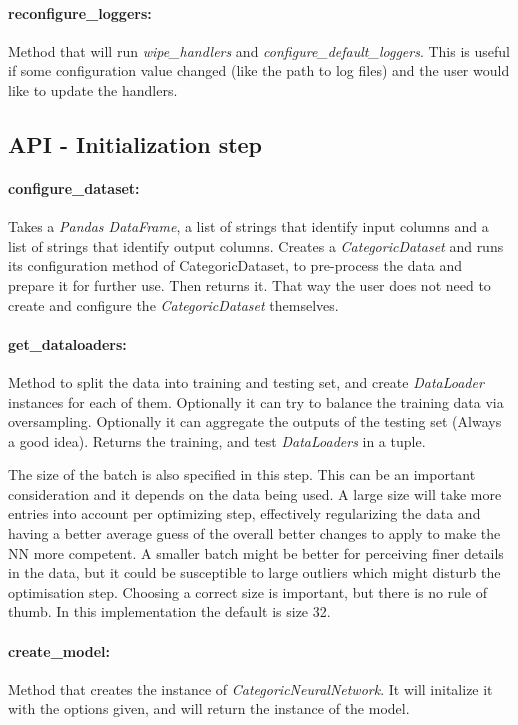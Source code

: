 \documentclass[a4paper, 11pt]{report}
\begin{document}
   \paragraph{reconfigure\_loggers:} Method that will run \textit{wipe\_handlers} and \textit{configure\_default\_loggers}. This is useful if some configuration value changed (like the path to log files) and the user would like to update the handlers.

   \subsection{API - Initialization step}
   \paragraph{configure\_dataset:} Takes a \textit{Pandas DataFrame}, a list of strings that identify input columns and a list of strings that identify output columns. Creates a \textit{CategoricDataset} and runs its configuration method of CategoricDataset, to pre-process the data and prepare it for further use. Then returns it. That way the user does not need to create and configure the \textit{CategoricDataset} themselves.

   \paragraph{get\_dataloaders:} Method to split the data into training and testing set, and create \textit{DataLoader} instances for each of them. Optionally it can try to balance the training data via oversampling. Optionally it can aggregate the outputs of the testing set (Always a good idea). Returns the training, and test \textit{DataLoaders} in a tuple.

   The size of the batch is also specified in this step. This can be an important consideration and it depends on the data being used. A large size will take more entries into account per optimizing step, effectively regularizing the data and having a better average guess of the overall better changes to apply to make the NN more competent. A smaller batch might be better for perceiving finer details in the data, but it could be susceptible to large outliers which might disturb the optimisation step. Choosing a correct size is important, but there is no rule of thumb. In this implementation the default is size 32.

   \paragraph{create\_model:} Method that creates the instance of \textit{CategoricNeuralNetwork}. It will initalize it with the options given, and will return the instance of the model.
\end{document}
